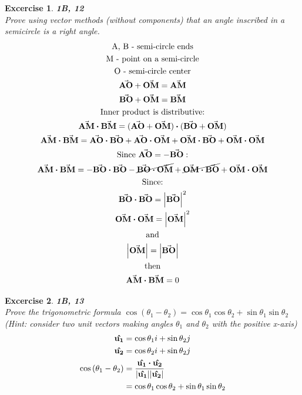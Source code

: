 \documentclass[11pt]{article}
\newtheorem{excercise}{Excercise}
\begin{document}
    \begin{excercise}
        \textbf{1B, 12}\\
        Prove using vector methods (without components) that an angle inscribed in a semicircle is a right angle.\\
        \begin{gather}
            \text{A, B - semi-circle ends}\\
            \text{M - point on a semi-circle}\\
            \text{O - semi-circle center}\\
            \va{AO} + \va{OM} = \va{AM}\\
            \va{BO} + \va{OM} = \va{BM}\\
            \text{Inner product is distributive:}\\
            \va{AM}\vdot\va{BM}=(\va{AO} + \va{OM})\vdot(\va{BO} + \va{OM})\\
            \va{AM}\vdot\va{BM}
            =\va{AO}\vdot\va{BO}
            + \va{AO}\vdot\va{OM}
            + \va{OM}\vdot\va{BO}
            + \va{OM}\vdot\va{OM}\\
            \text{Since $\va{AO} = -\va{BO}:$}\\
            \va{AM}\vdot\va{BM}
            =-\va{BO}\vdot\va{BO}
            - \cancel{\va{BO}\vdot\va{OM}}
            + \cancel{\va{OM}\vdot\va{BO}}
            + \va{OM}\vdot\va{OM}\\
            \text{Since:}\\
            \va{BO}\vdot\va{BO}=\abs{\va{BO}}^2 \\
            \va{OM}\vdot\va{OM}=\abs{\va{OM}}^2 \\
            \text{and}\\
            \abs{\va{OM}}=\abs{\va{BO}}\\
            \text{then}\\
            \va{AM}\vdot\va{BM}=0
        \end{gather}

    \end{excercise}

    \begin{excercise}
        \textbf{1B, 13}\\
        Prove the trigonometric formula $\cos{(\theta_1 - \theta_2 )}=\cos{\theta_1}\cos{\theta_2} + \sin{\theta_1}\sin{\theta_2}$\\
        (Hint: consider two unit vectors making angles $\theta_1$ and $\theta_2$ with the positive x-axis)\\
        \begin{align}
            \vu{u_1} & = \cos{\theta_1}i + \sin{\theta_2}j\\
            \vu{u_2} & = \cos{\theta_2}i + \sin{\theta_2}j\\
            \cos{(\theta_1 - \theta_2)} & = \frac{\vu{u_1}\vdot\vu{u_2}}{\abs{\vu{u_1}}\abs{\vu{u_2}}}\\
            & = \cos{\theta_1}\cos{\theta_2} + \sin{\theta_1}\sin{\theta_2}
        \end{align}
    \end{excercise}
\end{document}

